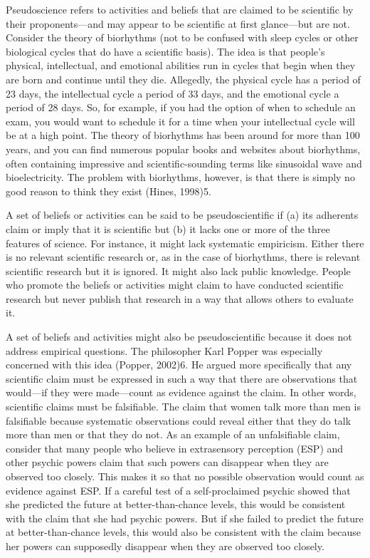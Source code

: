 Pseudoscience refers to activities and beliefs that are claimed to be scientific by their proponents---and may appear to be scientific at first glance---but are not. Consider the theory of biorhythms (not to be confused with sleep cycles or other biological cycles that do have a scientific basis). The idea is that people's physical, intellectual, and emotional abilities run in cycles that begin when they are born and continue until they die. Allegedly, the physical cycle has a period of 23 days, the intellectual cycle a period of 33 days, and the emotional cycle a period of 28 days. So, for example, if you had the option of when to schedule an exam, you would want to schedule it for a time when your intellectual cycle will be at a high point. The theory of biorhythms has been around for more than 100 years, and you can find numerous popular books and websites about biorhythms, often containing impressive and scientific-sounding terms like sinusoidal wave and bioelectricity. The problem with biorhythms, however, is that there is simply no good reason to think they exist (Hines, 1998)5.

A set of beliefs or activities can be said to be pseudoscientific if (a) its adherents claim or imply that it is scientific but (b) it lacks one or more of the three features of science. For instance, it might lack systematic empiricism. Either there is no relevant scientific research or, as in the case of biorhythms, there is relevant scientific research but it is ignored. It might also lack public knowledge. People who promote the beliefs or activities might claim to have conducted scientific research but never publish that research in a way that allows others to evaluate it.

A set of beliefs and activities might also be pseudoscientific because it does not address empirical questions. The philosopher Karl Popper was especially concerned with this idea (Popper, 2002)6. He argued more specifically that any scientific claim must be expressed in such a way that there are observations that would---if they were made---count as evidence against the claim. In other words, scientific claims must be falsifiable. The claim that women talk more than men is falsifiable because systematic observations could reveal either that they do talk more than men or that they do not. As an example of an unfalsifiable claim, consider that many people who believe in extrasensory perception (ESP) and other psychic powers claim that such powers can disappear when they are observed too closely. This makes it so that no possible observation would count as evidence against ESP. If a careful test of a self-proclaimed psychic showed that she predicted the future at better-than-chance levels, this would be consistent with the claim that she had psychic powers. But if she failed to predict the future at better-than-chance levels, this would also be consistent with the claim because her powers can supposedly disappear when they are observed too closely.

